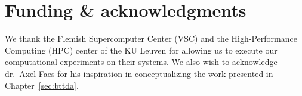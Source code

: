 \chapter*{Funding \& acknowledgments}

We thank the Flemish Supercomputer Center (VSC) and the High-Performance
Computing (HPC) center of the KU Leuven for allowing us to execute our
computational experiments on their systems.
We also wish to acknowledge dr.\ Axel Faes for his inspiration in conceptualizing
the work presented in Chapter~\ref{sec:bttda}.

